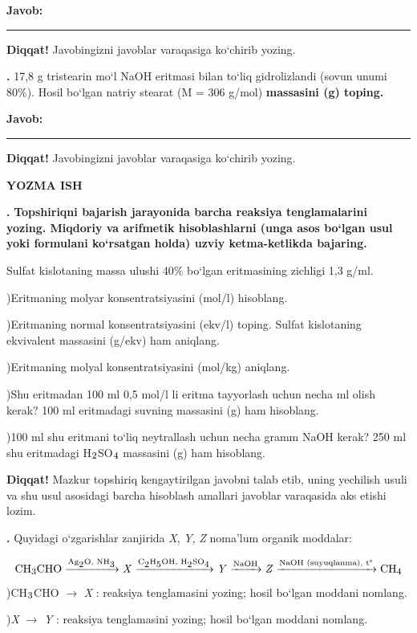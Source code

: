 \documentclass[11pt,a4paper]{article}
\renewcommand{\textsubscript}[1]{\ensuremath{_{\text{\fontsize{8}{8}\selectfont #1}}}}
\newcommand{\qn}[1]{\textbf{\fontsize{11.5}{13}\selectfont #1}}
\newcommand{\qsep}{\par\vspace{1pt}\noindent\rule{0pt}{0.4pt}\par\vspace{5pt}}
\newcommand{\diqqat}[1]{\par\smallskip\noindent\textbf{Diqqat!} #1\par\medskip}
\newcommand{\javob}{\par\smallskip\noindent\textbf{Javob:} \rule[-2pt]{7.5cm}{0.4pt}\par\smallskip\noindent\textbf{Diqqat!} Javobingizni javoblar varaqasiga ko`chirib yozing.\par\medskip}
\begin{document}
\javob\qsep
\noindent\qn{40.} 17,8 g tristearin mo`l NaOH eritmasi bilan to`liq gidrolizlandi (sovun unumi 80\%). Hosil bo`lgan natriy stearat (M = 306 g/mol) \textbf{massasini (g) toping.}
\javob\qsep
\par\bigskip\begin{center}\textbf{\fontsize{13}{15}\selectfont YOZMA ISH}\end{center}
\noindent\qn{41.} \textbf{Topshiriqni bajarish jarayonida barcha reaksiya tenglamalarini yozing. Miqdoriy va arifmetik hisoblashlarni (unga asos bo`lgan usul yoki formulani ko`rsatgan holda) uzviy ketma-ketlikda bajaring.}\par\smallskip
Sulfat kislotaning massa ulushi 40\% bo`lgan eritmasining zichligi 1,3 g/ml.\par
{})Eritmaning molyar konsentratsiyasini (mol/l) hisoblang.\par
{})Eritmaning normal konsentratsiyasini (ekv/l) toping. Sulfat kislotaning ekvivalent massasini (g/ekv) ham aniqlang.\par
{})Eritmaning molyal konsentratsiyasini (mol/kg) aniqlang.\par
{})Shu eritmadan 100 ml 0,5 mol/l li eritma tayyorlash uchun necha ml olish kerak? 100 ml eritmadagi suvning massasini (g) ham hisoblang.\par
{})100 ml shu eritmani to`liq neytrallash uchun necha gramm NaOH kerak? 250 ml shu eritmadagi H\textsubscript{2}SO\textsubscript{4} massasini (g) ham hisoblang.\par
\diqqat{Mazkur topshiriq kengaytirilgan javobni talab etib, uning yechilish usuli va shu usul asosidagi barcha hisoblash amallari javoblar varaqasida aks etishi lozim.}\qsep
\noindent\qn{42.} Quyidagi o`zgarishlar zanjirida \textit{X}, \textit{Y}, \textit{Z} noma'lum organik moddalar:\par
\[\setlength{\fboxsep}{0pt}\text{CH\textsubscript{3}CHO}\xrightarrow{\text{Ag\textsubscript{2}O, NH\textsubscript{3}}}\text{\textit{X}}\xrightarrow{\text{C\textsubscript{2}H\textsubscript{5}OH, H\textsubscript{2}SO\textsubscript{4}}}\text{\textit{Y}}\xrightarrow{\text{NaOH}}\text{\textit{Z}}\xrightarrow{\text{NaOH (suyuqlanma), t\textdegree{}}}\text{CH\textsubscript{4}}\]
)CH\textsubscript{3}CHO $\to$ \textit{X} : reaksiya tenglamasini yozing; hosil bo`lgan moddani nomlang.\par
{})\textit{X} $\to$ \textit{Y} : reaksiya tenglamasini yozing; hosil bo`lgan moddani nomlang.\par
\end{document}
